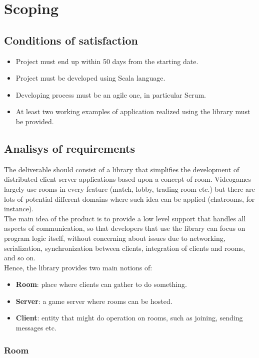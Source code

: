 \chapter{Scoping}

\section{Conditions of satisfaction}

\begin{itemize}
\item Project must end up within 50 days from the starting date. 
\item Project must be developed using Scala language.
\item Developing process must be an agile one, in particular Scrum.
\item At least two working examples of application realized using the library must be provided.
\end{itemize}

\section{Analisys of requirements}

The deliverable should consist of a library that simplifies the development of distributed client-server applications based upon a concept of room. Videogames largely use rooms in every feature (match, lobby, trading room etc.) but there are lots of potential different domains where such idea can be applied (chatrooms, for instance).
\\
The main idea of the product is to provide a low level support that handles all aspects of communication, so that developers that use the library can focus on program logic itself, without concerning about issues due to networking, serialization, synchronization between clients, integration of clients and rooms, and so on.
\\
Hence, the library provides two main notions of:
\begin{itemize}
\item \textbf{Room}: place where clients can gather to do something.
\item \textbf{Server}: a game server where rooms can be hosted.
\item \textbf{Client}: entity that might do operation on rooms, such as joining, sending messages etc.
\end{itemize} 

\subsection{Room}

